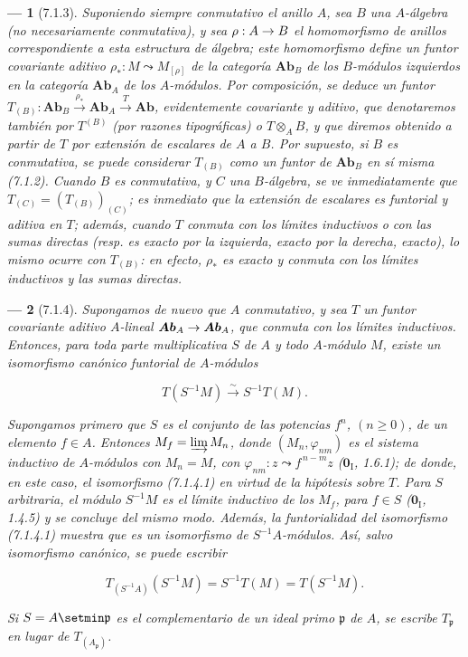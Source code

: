 \documentclass[10pt,oneside,openany]{book}
\theoremstyle{egaenv}\newtheorem*{env}{---}
\theoremstyle{egastatement}
\theoremstyle{egadescription}
\newcommand{\oldpage}[2][]{\marginnote{\normalfont\scriptsize\textbf{#1}\,|\,#2}\ignorespaces}
\renewcommand{\to}{\mathchoice{\longrightarrow}{\rightarrow}{\rightarrow}{\rightarrow}}
\begin{document}
\begin{env}[7.1.3]
Suponiendo siempre conmutativo el anillo $A$, sea $B$ una $A$-\emph{álgebra} (no
necesariamente conmutativa), y sea $\rho:A\to B$ el homomorfismo de anillos
correspondiente a esta estructura de álgebra; este homomorfismo define un
funtor covariante
\oldpage[III]{176}
aditivo $\rho_*:M\leadsto M_{[\rho]}$
de la categoría $\boldsymbol{Ab}_B$ de los $B$-módulos izquierdos en la categoría
$\boldsymbol{Ab}_A$ de los $A$-módulos. Por composición, se deduce un funtor $T_{(B)}:\boldsymbol{Ab}_B\xrightarrow{\rho_*}\boldsymbol{Ab}_A\xrightarrow{T}\boldsymbol{Ab}$,
evidentemente covariante y aditivo, que denotaremos también por $T^{(B)}$ (por
razones tipográficas) o $T\otimes_A B$, y que diremos obtenido a partir
de $T$ por \emph{extensión de escalares} de $A$ a $B$. Por supuesto, si $B$ es
conmutativa, se puede considerar $T_{(B)}$ como un funtor de
$\boldsymbol{Ab}_B$ en sí misma (7.1.2). Cuando $B$ es conmutativa, y $C$
una $B$-álgebra, se ve inmediatamente que $T_{(C)}=(T_{(B)})_{(C)}$;
es inmediato que la extensión de escalares es \emph{funtorial} y \emph{aditiva} en
$T$; además, cuando $T$ conmuta con los límites inductivos o con las sumas
directas (resp. es exacto por la izquierda, exacto por la derecha, exacto), lo mismo ocurre
con $T_{(B)}$: en efecto, $\rho_*$ es exacto y conmuta con los límites inductivos
y las sumas directas.
\end{env}

\begin{env}[7.1.4]
\label{III.7.1.4}
Supongamos de nuevo que $A$ conmutativo, y sea
$T$ un funtor covariante aditivo
$A$-lineal $\boldsymbol{Ab}_A\to\boldsymbol{Ab}_A$, \emph{que conmuta con los límites inductivos}. Entonces, para toda parte
multiplicativa $S$ de $A$ y
todo $A$-módulo $M$, existe un isomorfismo canónico funtorial de
$A$-módulos

\label{III.7.1.4.1}
\[
  T(S^{-1}M)\xrightarrow{\sim}S^{-1}T(M).
  \tag{7.1.4.1}\label{III.7.1.4.1.fr}
\]


Supongamos primero que $S$ es el conjunto de las potencias $f^n$,
$(n\geqslant0)$, de un elemento $f\in A$. Entonces
$M_f=\varinjlim M_n$,
donde $(M_n,\varphi_{nm})$ es el sistema inductivo de $A$-módulos
con $M_n=M$,
con $\varphi_{nm}:z\leadsto f^{\,n-m}z$ ($\mathbf{0}_{\mathrm I}$, 1.6.1);
de donde, en este caso, el isomorfismo (7.1.4.1) en virtud de la hipótesis sobre $T$. Para $S$ arbitraria, el módulo $S^{-1}M$ es
el límite inductivo de los $M_f$, para $f\in S$ ($\mathbf{0}_{\mathrm I}$, 1.4.5) y se concluye del mismo modo. Además,
la funtorialidad del isomorfismo (7.1.4.1) muestra que es un isomorfismo
de $S^{-1}A$-\emph{módulos}. Así, salvo
isomorfismo canónico, se puede escribir

\label{III.7.1.4.2}
\[
  T_{(S^{-1}A)}(S^{-1}M)
  =
  S^{-1}T(M)
  =
  T(S^{-1}M).
  \tag{7.1.4.2}\label{III.7.1.4.2.fr}
\]

Si $S=A\setmin\mathfrak p$ es el complementario de un ideal primo
$\mathfrak p$ de $A$, se escribe $T_{\mathfrak p}$ en lugar de
$T_{(A_{\mathfrak p})}$.
\end{env}
\end{document}
